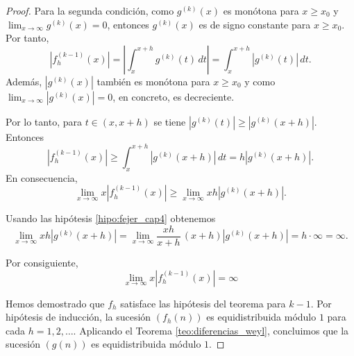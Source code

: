 \begin{proof}
    Para la segunda condición, como $g^{(k)}(x)$ es monótona para $x \geq x_0$ y 
    $\lim_{x \to \infty} g^{(k)}(x) = 0$, entonces $g^{(k)}(x)$ es de signo constante 
    para $x \geq x_0$. Por tanto,
    \[
        \left|f_h^{(k-1)}(x)\right| = 
        \left|\int_x^{x+h} g^{(k)}(t) \, dt\right| = 
        \int_x^{x+h} \left|g^{(k)}(t)\right| \, dt.
    \]
    Además, $\left|g^{(k)}(x)\right|$ también es monótona para $x \geq x_0$ y como
    $\lim_{x \to \infty} \left|g^{(k)}(x)\right| = 0$, en concreto, es decreciente.
    
    Por lo tanto, para $t \in (x,x+h)$ se tiene $\left|g^{(k)}(t)\right| \geq \left|g^{(k)}(x+h)\right|$.
    Entonces
    \[
        \left|f_h^{(k-1)}(x)\right| \geq \int_x^{x+h} \left|g^{(k)}(x+h)\right| \, dt = h \left|g^{(k)}(x+h)\right|.
    \]
    En consecuencia,
    \[
        \lim_{x \to \infty} x \left|f_h^{(k-1)}(x)\right| \geq 
        \lim_{x \to \infty} xh \left|g^{(k)}(x+h)\right|.
    \]
    
    Usando las hipótesis \ref{hipo:fejer_cap4} obtenemos
    \[
        \lim_{x \to \infty} xh \left|g^{(k)}(x+h)\right| = 
        \lim_{x \to \infty} \frac{xh}{x+h}\,\left(x+h\right)\left|g^{(k)}(x+h)\right| = h\cdot\infty=\infty.
    \]
    
    Por consiguiente,
    \[
        \lim_{x \to \infty} x\left|f_h^{(k-1)}(x)\right| = \infty
    \]
    
    Hemos demostrado que $f_h$ satisface las hipótesis del teorema para $k-1$. Por hipótesis de inducción,
    la sucesión $(f_h(n))$ es equidistribuida módulo $1$ para cada $h=1,2,\dots$. Aplicando el Teorema 
    \ref{teo:diferencias_weyl}, concluimos que la sucesión $(g(n))$ es equidistribuida módulo $1$.
\end{proof}